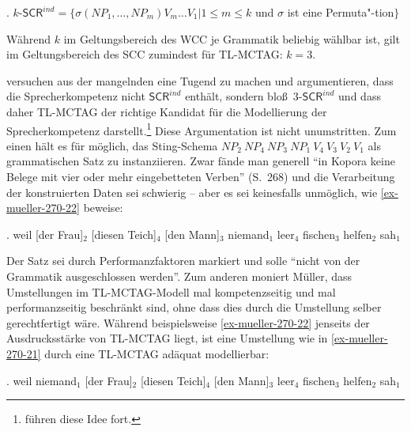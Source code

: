 \ex. $k$-$\mathsf{SCR}^{ind} = \{ \sigma(\mathit{NP}_1,\ldots,\mathit{NP}_m) V_m \ldots V_1 | 1 \leq m \leq k$ und $\sigma$ ist eine Permuta"-tion$\}$

Während $k$ im Geltungsbereich des WCC je Grammatik beliebig wählbar ist, gilt im Geltungsbereich des SCC zumindest für TL-MCTAG: $k = 3$.

\cite{Joshi:Becker:Rambow:00} versuchen aus der mangelnden  eine Tugend zu machen und argumentieren, dass die Sprecherkompetenz nicht $\mathsf{SCR}^{ind}$ enthält, sondern blo\ss\ 3-$\mathsf{SCR}^{ind}$ und dass daher TL-MCTAG der richtige Kandidat für die Modellierung der Sprecherkompetenz darstellt.\footnote{\cite{Chen-Main:Joshi:08,Chen-Main:Joshi:12} führen diese Idee fort.} Diese Argumentation ist nicht unumstritten. Zum einen hält es \citet[Abschnitt~10.6.3]{Mueller:10} für möglich, das Sting-Schema $\mathit{NP}_2 ~ \mathit{NP}_4 ~ \mathit{NP}_3 ~ \mathit{NP}_1 ~ V_4 ~ V_3 ~ V_2 ~ V_1$ als grammatischen Satz zu instanziieren. Zwar fände man generell "`in Kopora keine Belege mit vier oder mehr eingebetteten Verben"' (S.~268) und die Verarbeitung der konstruierten Daten sei schwierig -- aber es sei keinesfalls unmöglich, wie \ref{ex-mueller-270-22} beweise:   

\ex. \label{ex-mueller-270-22}weil [der Frau]$_2$ [diesen Teich]$_4$ [den Mann]$_3$ niemand$_1$ leer$_4$ fischen$_3$ helfen$_2$ sah$_1$ \hfill \citep[270]{Mueller:10}

Der Satz sei durch Performanzfaktoren markiert und solle "`nicht von der Grammatik ausgeschlossen werden"'. Zum anderen moniert Müller, dass Umstellungen im TL-MCTAG-Modell mal kompetenzseitig und mal performanzseitig beschränkt sind, ohne dass dies durch die Umstellung selber gerechtfertigt wäre. Während beispielsweise \ref{ex-mueller-270-22} jenseits der Ausdrucksstärke von TL-MCTAG liegt, ist eine Umstellung wie in \ref{ex-mueller-270-21} durch eine TL-MCTAG adäquat modellierbar: 

\ex. \label{ex-mueller-270-21}weil niemand$_1$ [der Frau]$_2$ [diesen Teich]$_4$ [den Mann]$_3$ leer$_4$ fischen$_3$ helfen$_2$ sah$_1$ \hfill \citep[270]{Mueller:10}

